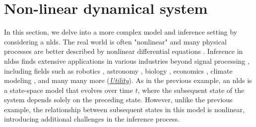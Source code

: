 \section{Non-linear dynamical system}\label{chapter-05:section:nonlinear-dynamical-system}

In this section, we delve into a more complex model and inference setting by considering a \ac{nlds}.
The real world is often "nonlinear" and many physical processes are better described by
nonlinear differential equations \citep{roubicek_nonlinear_2013}.
Inference in \acp{nlds} finds extensive applications in various industries beyond
signal processing \citep{Revach_kalmannet_2022}, including fields such as robotics
\citep{cernousko_control_2008}, astronomy \citep{Contopoulos_astronomy_nlds}, biology
\citep{Janson_bilogy_nlds}, economics \citep{hsieh_chaos_1991}, climate modeling
\citep{mukhin_principal_2015}, and many many more (\hyperlink{experiments:utility}{\emph{Utility}}).
As in the previous example, an \ac{nlds} is a state-space model that evolves over time
$t$, where the subsequent state of the system depends solely on the preceding state.
However, unlike the previous example, the relationship between subsequent states in this model is
nonlinear, introducing additional challenges in the inference process.

